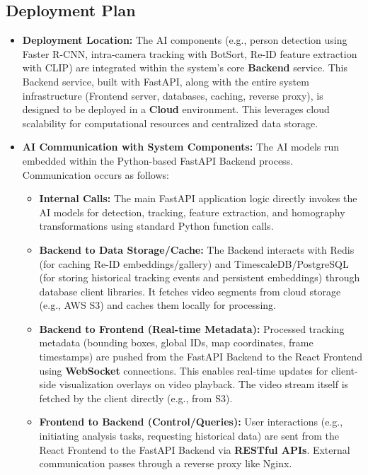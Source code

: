\subsection{Deployment Plan}
\label{subsection:deployment_plan_aic}
\begin{itemize}
    \item \textbf{Deployment Location:}
        The AI components (e.g., person detection using Faster R-CNN, intra-camera tracking with BotSort, Re-ID feature extraction with CLIP) are integrated within the system's core \textbf{Backend} service. This Backend service, built with FastAPI, along with the entire system infrastructure (Frontend server, databases, caching, reverse proxy), is designed to be deployed in a \textbf{Cloud} environment. This leverages cloud scalability for computational resources and centralized data storage.

    \item \textbf{AI Communication with System Components:}
        The AI models run embedded within the Python-based FastAPI Backend process. Communication occurs as follows:
        \begin{itemize}
            \item \textbf{Internal Calls:} The main FastAPI application logic directly invokes the AI models for detection, tracking, feature extraction, and homography transformations using standard Python function calls.
            \item \textbf{Backend to Data Storage/Cache:} The Backend interacts with Redis (for caching Re-ID embeddings/gallery) and TimescaleDB/PostgreSQL (for storing historical tracking events and persistent embeddings) through database client libraries. It fetches video segments from cloud storage (e.g., AWS S3) and caches them locally for processing.
            \item \textbf{Backend to Frontend (Real-time Metadata):} Processed tracking metadata (bounding boxes, global IDs, map coordinates, frame timestamps) are pushed from the FastAPI Backend to the React Frontend using \textbf{WebSocket} connections. This enables real-time updates for client-side visualization overlays on video playback. The video stream itself is fetched by the client directly (e.g., from S3).
            \item \textbf{Frontend to Backend (Control/Queries):} User interactions (e.g., initiating analysis tasks, requesting historical data) are sent from the React Frontend to the FastAPI Backend via \textbf{RESTful APIs}. External communication passes through a reverse proxy like Nginx.
        \end{itemize}


\end{itemize}
